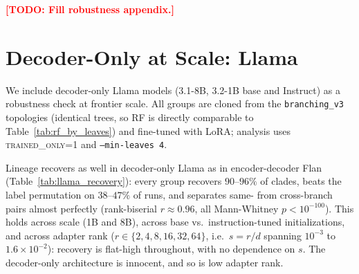 \documentclass{article}
\newcommand{\TODO}[1]{\textcolor{red}{\textbf{[TODO: #1]}}}
\begin{document}
\TODO{Fill robustness appendix.}

\section{Decoder-Only at Scale: Llama}
\label{app:llama}

We include decoder-only Llama models (3.1-8B, 3.2-1B base and Instruct) as a robustness check at
frontier scale. All groups are cloned from the \texttt{branching\_v3} topologies (identical trees, so
RF is directly comparable to Table~\ref{tab:rf_by_leaves}) and fine-tuned with LoRA; analysis uses
\textsc{trained\_only=1} and \texttt{--min-leaves 4}.

Lineage recovers as well in decoder-only Llama as in encoder-decoder Flan
(Table~\ref{tab:llama_recovery}): every group recovers $90$--$96\%$ of clades, beats the label
permutation on $38$--$47\%$ of runs, and separates same- from cross-branch pairs almost perfectly
(rank-biserial $r\approx0.96$, all Mann-Whitney $p<10^{-100}$). This holds across scale (1B and 8B),
across base vs.\ instruction-tuned initializations, and across adapter rank ($r\in\{2,4,8,16,32,64\}$,
i.e.\ $s=r/d$ spanning $10^{-3}$ to $1.6\!\times\!10^{-2}$): recovery is flat-high throughout, with
no dependence on $s$. The decoder-only architecture is innocent, and so is low adapter rank.
\end{document}
